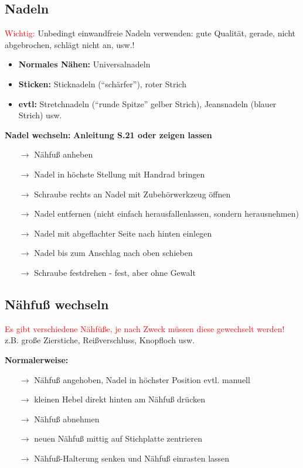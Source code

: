 \documentclass{\basedir/fablab-document}
\begin{document}
\subsection{Nadeln}
\textcolor{red}{Wichtig:} Unbedingt einwandfreie Nadeln verwenden: gute Qualität, gerade, nicht abgebrochen, schlägt nicht an, usw.!
\begin{itemize}
 \item \textbf{Normales Nähen:} Universalnadeln
 \item \textbf{Sticken:} Sticknadeln (“schärfer”), roter Strich
 \item \textbf{evtl:} Stretchnadeln (“runde Spitze” gelber Strich), Jeansnadeln (blauer Strich) usw.
\end{itemize}

\vspace{2em}

\textbf{Nadel wechseln:}
\newline \textbf{Anleitung S.21 oder zeigen lassen}
\begin{itemize}
 \item[$\rightarrow$] Nähfuß anheben
 \item[$\rightarrow$] Nadel in höchste Stellung mit Handrad bringen
 \item[$\rightarrow$] Schraube rechts an Nadel mit Zubehörwerkzeug öffnen
 \item[$\rightarrow$] Nadel entfernen (nicht einfach herausfallenlassen, sondern herausnehmen)
 \item[$\rightarrow$] Nadel mit abgeflachter Seite nach hinten einlegen
 \item[$\rightarrow$] Nadel bis zum Anschlag nach oben schieben
 \item[$\rightarrow$] Schraube festdrehen -  fest, aber ohne Gewalt
\end{itemize}

\subsection{Nähfuß wechseln}
\textcolor{red}{Es gibt verschiedene Nähfüße, je nach Zweck müssen diese gewechselt werden! }
\newline z.B. große Zierstiche, Reißverschluss, Knopfloch usw. 

\vspace{2em}

\textbf{Normalerweise:}
\begin{itemize}
 \item[$\rightarrow$] Nähfuß angehoben, Nadel in höchster Position evtl. manuell
 \item[$\rightarrow$] kleinen Hebel direkt hinten am Nähfuß drücken
 \item[$\rightarrow$] Nähfuß abnehmen
 \item[$\rightarrow$] neuen Nähfuß mittig auf Stichplatte zentrieren 
 \item[$\rightarrow$] Nähfuß-Halterung senken und Nähfuß einrasten lassen
\end{itemize}
\end{document}
